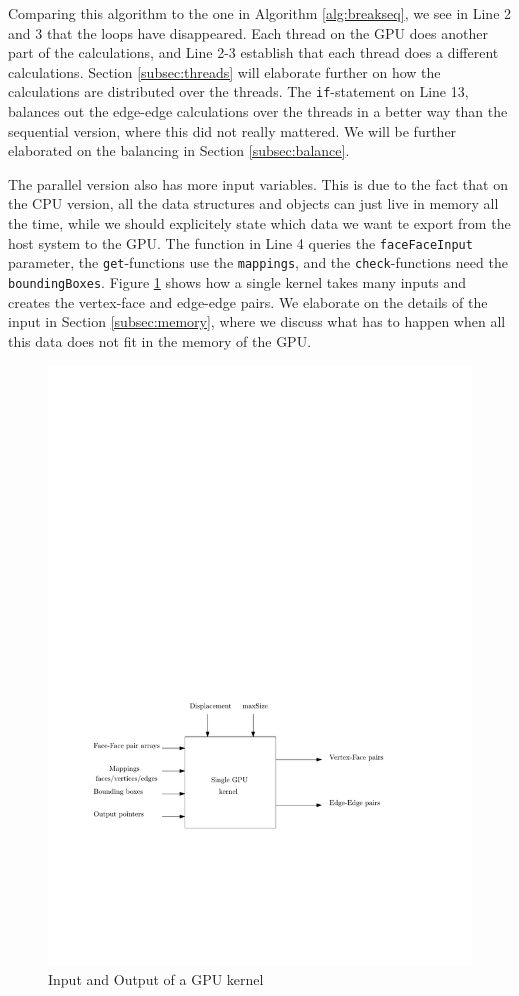 Comparing this algorithm to the one in Algorithm \ref{alg:breakseq}, we see in Line 2 and 3 that the loops have disappeared. Each thread on the GPU does another part of the calculations, and Line 2-3 establish that each thread does a different calculations. Section \ref{subsec:threads} will elaborate further on how the calculations are distributed over the threads. The \texttt{if}-statement on Line 13, balances out the edge-edge calculations over the threads in a better way than the sequential version, where this did not really mattered. We will be further elaborated on the balancing in Section \ref{subsec:balance}.

 The parallel version also has more input variables. This is due to the fact that on the CPU version, all the data structures and objects can just live in memory all the time, while we should explicitely state which data we want te export from the host system to the GPU. The function in Line 4 queries the \texttt{faceFaceInput} parameter, the \texttt{get}-functions use the \texttt{mappings}, and the \texttt{check}-functions need the \texttt{boundingBoxes}. Figure \ref{fig:kernel} shows how a single kernel takes many inputs and creates the vertex-face and edge-edge pairs. We elaborate on the details of the input in Section \ref{subsec:memory}, where we discuss what has to happen when all this data does not fit in the memory of the GPU.

\begin{figure}
	\includegraphics{threadbox.pdf}
	\caption{Input and Output of a GPU kernel}
	\label{fig:kernel}
\end{figure}

